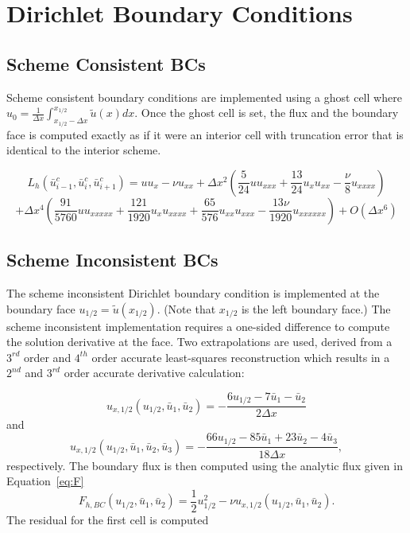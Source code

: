 \documentclass[10pt]{article}%
\begin{document}
\section{Dirichlet Boundary Conditions}

\subsection{Scheme Consistent BCs}
Scheme consistent boundary conditions are implemented using a ghost cell where $u_0 = \frac{1}{\Delta x} \int_{x_{1/2}-\Delta x}^{x_{1/2}} \tilde u(x)dx$. Once the ghost cell is set, the flux and the boundary face is computed exactly as if it were an interior cell with truncation error that is identical to the interior scheme. 


\[
  L_h(\bar u^c_{i-1},\bar u^c_{i},\bar u^c_{i+1}) = u u_x - \nu u_{xx}
                                    + \Delta x^2\left( \frac{5}{24}u u_{xxx} + \frac{13}{24}u_x u_{xx} - \frac{\nu}{8} u_{xxxx} \right)
\]
\[
                                    + \Delta x^4\left( \frac{91}{5760}u u_{xxxxx} + \frac{121}{1920} u_x u_{xxxx} + \frac{65}{576}u_{xx}u_{xxx} - \frac{13\nu}{1920} u_{xxxxxx} \right)
                                    + O(\Delta x^6)
\]



\subsection{Scheme Inconsistent BCs}
The scheme inconsistent Dirichlet boundary condition is implemented at the boundary face $u_{1/2} = \tilde u(x_{1/2})$. (Note that $x_{1/2}$ is the left boundary face.)  The scheme inconsistent implementation requires a one-sided difference to compute the solution derivative at the face. Two extrapolations are used, derived from a $3^{rd}$ order and $4^{th}$ order accurate least-squares reconstruction which results in a $2^{nd}$ and $3^{rd}$ order accurate derivative calculation: 

\[
  u_{x,1/2}\left(u_{1/2}, \bar u_1, \bar u_2\right) = - \frac{6 u_{1/2} - 7 \bar u_1 - \bar u_2 }{2 \Delta x} 
\]
and
\[
  u_{x,1/2}(u_{1/2}, \bar u_1, \bar u_2, \bar u_3) = - \frac{66 u_{1/2} -85 \bar u_1 + 23 \bar u_2 - 4 \bar u_3 }{18 \Delta x},
\]
respectively. The boundary flux is then computed using the analytic flux given in Equation~\ref{eq:F}
\[
F_{h,BC}\left(u_{1/2}, \bar u_1, \bar u_2\right) 
= \frac{1}{2} u_{1/2}^2 - \nu u_{x,1/2}\left(u_{1/2}, \bar u_1, \bar u_2\right).
\]
The residual for the first cell is computed 
\end{document}
